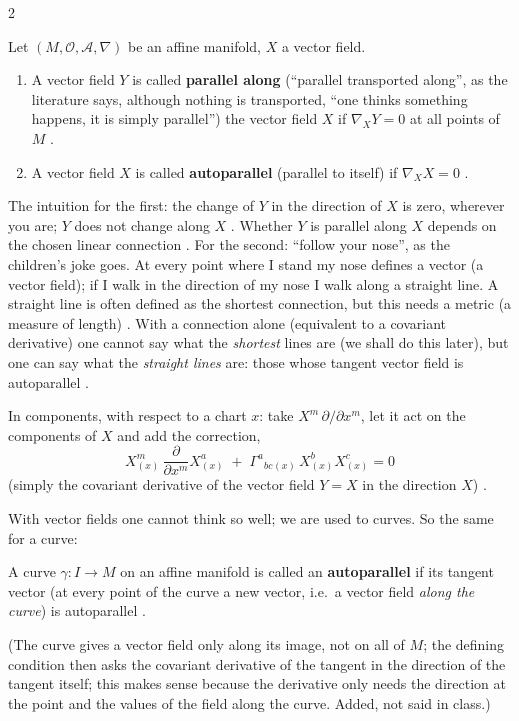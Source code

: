 \begin{paracol}{2}
\begin{definition}\label{def:cf-parallel}
Let $(M,\mathcal O,\mathcal A,\nabla)$ be an affine manifold, $X$ a vector field.
\begin{enumerate}
  \item A vector field $Y$ is called \textbf{parallel along} (``parallel transported along'', as the literature says, although
        nothing is transported, ``one thinks something happens, it is simply parallel'') the vector field $X$ if
        $\nabla_XY=0$ at all points of $M$ .
  \item A vector field $X$ is called \textbf{autoparallel} (parallel to itself) if $\nabla_XX=0$ .
\end{enumerate}
\end{definition}
The intuition for the first: the change of $Y$ in the direction of $X$ is zero, wherever you are; $Y$ does not change along $X$
. Whether $Y$ is parallel along $X$ depends on the chosen linear connection .
For the second: ``follow your nose'', as the children's joke goes. At every point where I stand my nose defines a vector (a vector
field); if I walk in the direction of my nose I walk along a straight line. A straight line is often defined as the shortest
connection, but this needs a metric (a measure of length) . With a connection alone (equivalent to a covariant
derivative) one cannot say what the \emph{shortest} lines are (we shall do this later), but one can say what the \emph{straight lines} are:
those whose tangent vector field is autoparallel .

In components, with respect to a chart $x$: take $X^m\,\partial/\partial x^m$, let it act on the components of $X$ and add the correction,
\begin{equation}\label{eq:cf-autoparallel-field}
  X^m_{(x)}\,\frac{\partial}{\partial x^m}X^a_{(x)}\;+\;\Gamma^a{}_{bc}{}_{(x)}\,X^b_{(x)}X^c_{(x)}=0
\end{equation}
(simply the covariant derivative of the vector field $Y=X$ in the direction $X$) .

With vector fields one cannot think so well; we are used to curves. So the same for a curve:
\begin{definition}\label{def:cf-autoparallel-curve}
A curve $\gamma\colon I\to M$ on an affine manifold is called an \textbf{autoparallel} if its tangent vector (at every point of the
curve a new vector, i.e.\ a vector field \emph{along the curve}) is autoparallel .
\end{definition}
(The curve gives a vector field only along its image, not on all of $M$; the defining condition then asks the covariant derivative of the
tangent in the direction of the tangent itself; this makes sense because the derivative only needs the direction at the point and the
values of the field along the curve. Added, not said in class.)


\end{paracol}
